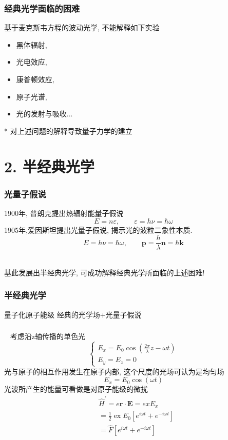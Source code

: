 \begin{frame}
      \frametitle{经典光学面临的困难}
      基于麦克斯韦方程的波动光学, 不能解释如下实验
      \begin{itemize}
          \item 黑体辐射, 
          \item 光电效应, 
          \item 康普顿效应, 
          \item 原子光谱, 
          \item 光的发射与吸收...
      \end{itemize}
      * 对上述问题的解释导致量子力学的建立
\end{frame}

\section{2. 半经典光学}

\begin{frame}
      \frametitle{光量子假说}
      1900年, 普朗克提出热辐射能量子假说
      \[E= n \varepsilon , \qquad \varepsilon= h \nu= \hbar \omega\]
      1905年,爱因斯坦提出光量子假说, 揭示光的波粒二象性本质.  \\ {\vspace*{1em}}
      \[E= h \nu= \hbar \omega, \qquad  \mathbf{p}=\frac{h}{\lambda} \mathbf{n} = \hbar \mathbf{k} \]  
      \\  \vspace*{3em}

      基此发展出半经典光学, 可成功解释经典光学所面临的上述困难!
\end{frame}

\begin{frame}
    \frametitle{半经典光学}     
    \begin{itemize}
        \Item 量子化原子能级
        \Item 经典的光学场+光量子假说
    \end{itemize}  
\end{frame}

\begin{frame}
      \frametitle{}
      \例 [2. 试采用半经典方法处理光与原子的相互作用问题] {}
      \解~ 考虑沿z轴传播的单色光 
      \[ \left\{\begin{array}{l}
        E_{x}=E_{0} \cos \left(\frac{2 \pi}{\lambda} z-\omega t\right) \\
        E_{y}=E_{z}=0
        \end{array}\right. \]
     光与原子的相互作用发生在原子内部, 这个尺度的光场可认为是均匀场
     \[E_{x}=E_{0} \cos \left(\omega t\right)  \]
     光波所产生的能量可看做是对原子能级的微扰 
     \[\begin{aligned}
        &\hat{H}^{\prime}=e\mathbf{r}\cdot\mathbf{E}  = ex E_{x} \\
        &=\frac{1}{2} \operatorname{ex} E_{0}\left[e^{i \omega t}+e^{-i \omega t}\right] \\
        &=\hat{F}\left[e^{i \omega t}+e^{-i \omega t}\right]
        \end{aligned}
      \]
\end{frame}

